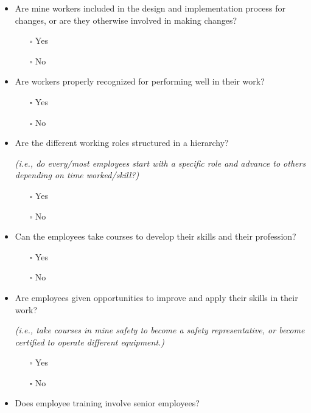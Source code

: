 \documentclass[
  12pt,
]{scrbook}
\providecommand{\tightlist}{%
  \setlength{\itemsep}{0pt}\setlength{\parskip}{0pt}}
\begin{document}
\begin{itemize}
\item
  Are mine workers included in the design and implementation process for changes, or are they otherwise involved in making changes?

  \begin{itemize}
  \tightlist
  \item[$\square$]
    Yes
  \item[$\square$]
    No
  \end{itemize}
\item
  Are workers properly recognized for performing well in their work?

  \begin{itemize}
  \tightlist
  \item[$\square$]
    Yes
  \item[$\square$]
    No
  \end{itemize}
\item
  Are the different working roles structured in a hierarchy?

  \emph{(i.e., do every/most employees start with a specific role and advance to others depending on time worked/skill?)}

  \begin{itemize}
  \tightlist
  \item[$\square$]
    Yes
  \item[$\square$]
    No
  \end{itemize}
\item
  Can the employees take courses to develop their skills and their profession?

  \begin{itemize}
  \tightlist
  \item[$\square$]
    Yes
  \item[$\square$]
    No
  \end{itemize}
\item
  Are employees given opportunities to improve and apply their skills in their work?

  \emph{(i.e., take courses in mine safety to become a safety representative, or become certified to operate different equipment.)}

  \begin{itemize}
  \tightlist
  \item[$\square$]
    Yes
  \item[$\square$]
    No
  \end{itemize}
\item
  Does employee training involve senior employees?


\end{itemize}
\end{document}
